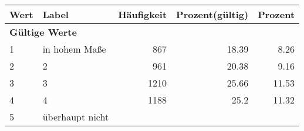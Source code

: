      \begin{longtable}{lXrrr}
     \toprule
     \textbf{Wert} & \textbf{Label} & \textbf{Häufigkeit} & \textbf{Prozent(gültig)} & \textbf{Prozent} \\
     \endhead
     \midrule
     \multicolumn{5}{l}{\textbf{Gültige Werte}}\\

     1 &
     \multicolumn{1}{X}{ in hohem Maße   } &


       \num{867} &
       \num[round-mode=places,round-precision=2]{18.39} &
         \num[round-mode=places,round-precision=2]{8.26} \\

     2 &
     \multicolumn{1}{X}{ 2   } &


       \num{961} &
       \num[round-mode=places,round-precision=2]{20.38} &
         \num[round-mode=places,round-precision=2]{9.16} \\

     3 &
     \multicolumn{1}{X}{ 3   } &


       \num{1210} &
       \num[round-mode=places,round-precision=2]{25.66} &
         \num[round-mode=places,round-precision=2]{11.53} \\

     4 &
     \multicolumn{1}{X}{ 4   } &


       \num{1188} &
       \num[round-mode=places,round-precision=2]{25.2} &
         \num[round-mode=places,round-precision=2]{11.32} \\

     5 &
     \multicolumn{1}{X}{ überhaupt nicht   } &



\end{longtable}
